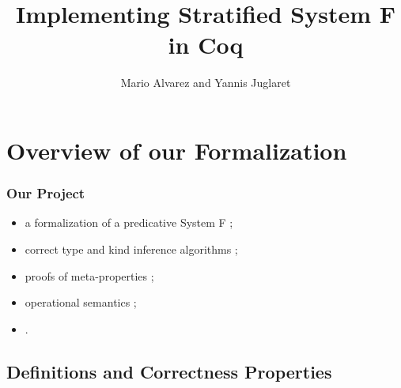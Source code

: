 \documentclass{beamer}
\title{Implementing Stratified System F in Coq}
\author{Mario Alvarez and Yannis Juglaret}
\date{\displaydate{date}}
\begin{document}
\begin{frame}
\titlepage
\end{frame}




\section{Overview of our Formalization}




\begin{frame}
  \frametitle{Our Project}

  \begin{itemize}
    \item a formalization of a predicative System F ;
    \item correct type and kind inference algorithms ;
    \item proofs of meta-properties ;
    \item operational semantics ;
    \item . %
  \end{itemize}

\end{frame}

\subsection{Definitions and Correctness Properties}
\end{document}
